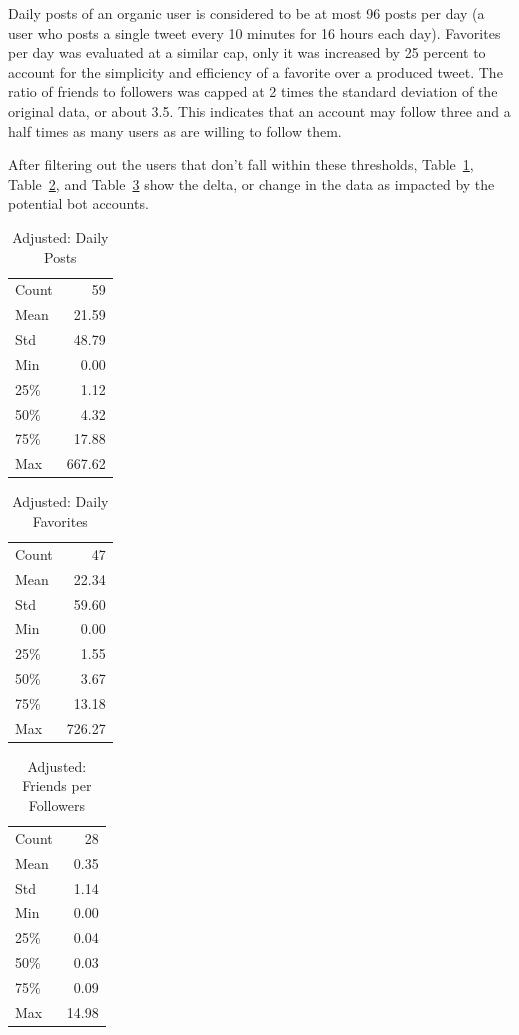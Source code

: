 Daily posts of an organic user is considered to be at most 96 posts per day (a
user who posts a single tweet every 10 minutes for 16 hours each day).
Favorites per day was evaluated at a similar cap, only it was increased by 25
percent to account for the simplicity and efficiency of a favorite over a
produced tweet.  The ratio of friends to followers was capped at 2 times the
standard deviation of the original data, or about 3.5. This indicates that an
account may follow three and a half times as many users as are willing to
follow them. 

After filtering out the users that don't fall within these thresholds,
Table~\ref{t:post-delta}, Table~\ref{t:faves-delta}, and
Table~\ref{t:ratio-delta} show the delta, or change in the data as impacted by
the potential bot accounts.

\begin{table}[htb]
\centering
\caption{Adjusted: Daily Posts}
\label{t:post-delta}
\begin{tabular}{lr}
Count & 59  \\
Mean  & 21.59  \\
Std   & 48.79  \\
Min   & 0.00   \\
25\%  & 1.12   \\
50\%  & 4.32   \\
75\%  & 17.88  \\
Max   & 667.62
\end{tabular}
\end{table}

\begin{table}[htb]
\centering
\caption{Adjusted: Daily Favorites}
\label{t:faves-delta}
\begin{tabular}{lr}
Count & 47  \\
Mean  & 22.34  \\
Std   & 59.60  \\
Min   & 0.00   \\
25\%  & 1.55   \\
50\%  & 3.67   \\
75\%  & 13.18  \\
Max   & 726.27
\end{tabular}
\end{table}

\begin{table}[htb]
\centering
\caption{Adjusted: Friends per Followers}
\label{t:ratio-delta}
\begin{tabular}{lr}
Count & 28 \\
Mean  & 0.35  \\
Std   & 1.14  \\
Min   & 0.00  \\
25\%  & 0.04  \\
50\%  & 0.03  \\
75\%  & 0.09  \\
Max   & 14.98 
\end{tabular}
\end{table}

